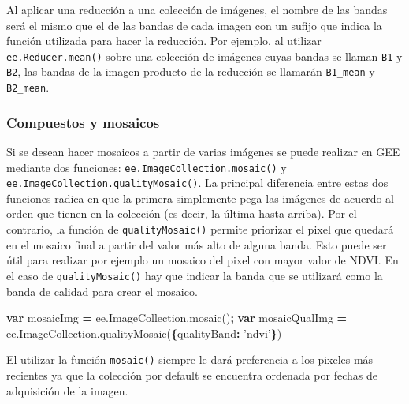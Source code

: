 \documentclass[
]{article}
\newenvironment{Shaded}{\begin{snugshade}}{\end{snugshade}}
\newcommand{\AttributeTok}[1]{\textcolor[rgb]{0.77,0.63,0.00}{#1}}
\newcommand{\DataTypeTok}[1]{\textcolor[rgb]{0.13,0.29,0.53}{#1}}
\newcommand{\KeywordTok}[1]{\textcolor[rgb]{0.13,0.29,0.53}{\textbf{#1}}}
\newcommand{\NormalTok}[1]{#1}
\newcommand{\OperatorTok}[1]{\textcolor[rgb]{0.81,0.36,0.00}{\textbf{#1}}}
\newcommand{\StringTok}[1]{\textcolor[rgb]{0.31,0.60,0.02}{#1}}
\newcommand{\VariableTok}[1]{\textcolor[rgb]{0.00,0.00,0.00}{#1}}
\begin{document}
\begin{tipblock}
Al aplicar una reducción a una colección de imágenes, el nombre de las
bandas será el mismo que el de las bandas de cada imagen con un sufijo
que indica la función utilizada para hacer la reducción. Por ejemplo, al
utilizar \texttt{ee.Reducer.mean()} sobre una colección de imágenes
cuyas bandas se llaman \texttt{B1} y \texttt{B2}, las bandas de la
imagen producto de la reducción se llamarán \texttt{B1\_mean} y
\texttt{B2\_mean}.

\end{tipblock}

\hypertarget{compuestos-y-mosaicos}{%
\subsubsection{Compuestos y mosaicos}\label{compuestos-y-mosaicos}}

Si se desean hacer mosaicos a partir de varias imágenes se puede
realizar en GEE mediante dos funciones:
\texttt{ee.ImageCollection.mosaic()} y
\texttt{ee.ImageCollection.qualityMosaic()}. La principal diferencia
entre estas dos funciones radica en que la primera simplemente pega las
imágenes de acuerdo al orden que tienen en la colección (es decir, la
última hasta arriba). Por el contrario, la función de
\texttt{qualityMosaic()} permite priorizar el pixel que quedará en el
mosaico final a partir del valor más alto de alguna banda. Esto puede
ser útil para realizar por ejemplo un mosaico del pixel con mayor valor
de NDVI. En el caso de \texttt{qualityMosaic()} hay que indicar la banda
que se utilizará como la banda de calidad para crear el mosaico.

\begin{Shaded}
\begin{Highlighting}[]
\KeywordTok{var}\NormalTok{ mosaicImg }\OperatorTok{=} \VariableTok{ee}\NormalTok{.}\VariableTok{ImageCollection}\NormalTok{.}\AttributeTok{mosaic}\NormalTok{()}\OperatorTok{;}
\KeywordTok{var}\NormalTok{ mosaicQualImg }\OperatorTok{=} \VariableTok{ee}\NormalTok{.}\VariableTok{ImageCollection}\NormalTok{.}\AttributeTok{qualityMosaic}\NormalTok{(}\OperatorTok{\{}\DataTypeTok{qualityBand}\OperatorTok{:} \StringTok{'ndvi'}\OperatorTok{\}}\NormalTok{)}
\end{Highlighting}
\end{Shaded}

\begin{tipblock}
El utilizar la función \texttt{mosaic()} siempre le dará preferencia a
los pixeles más recientes ya que la colección por default se encuentra
ordenada por fechas de adquisición de la imagen.

\end{tipblock}
\end{document}

